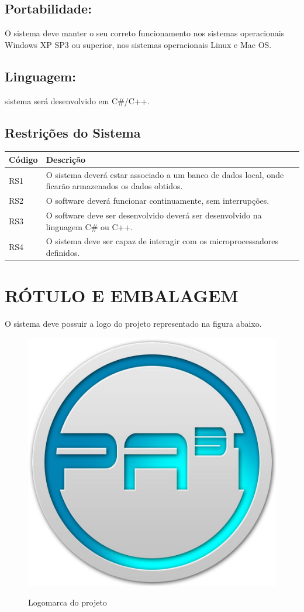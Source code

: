   \subsection*{Portabilidade:}
  O sistema deve manter o seu correto funcionamento nos sistemas operacionais Windows XP SP3 ou superior, nos sistemas operacionais Linux e Mac OS.
	
  \subsection*{Linguagem:}
   sistema será desenvolvido em C\#/C++.

  \subsection*{Restrições do Sistema}
  
     \begin{longtable}{|m{4.0cm}|m{12.2cm}|}
  \hline
\textbf{Código} & \textbf{Descrição}\\
  \hline
RS1 & O sistema deverá estar associado a um banco de dados local, onde ficarão armazenados os dados obtidos.\\
  \hline
RS2 & O software deverá funcionar continuamente, sem interrupções.\\
  \hline
RS3 & O software deve ser desenvolvido deverá ser desenvolvido na linguagem C\# ou C++.\\
  \hline
RS4 & O sistema deve ser capaz de interagir com os microprocessadores definidos.\\
  \hline
 \end{longtable}
  
  \section*{RÓTULO E EMBALAGEM}
  
  O sistema deve possuir a logo do projeto representado na figura abaixo.
  
    \begin{figure}[!h]
    \centering
    \includegraphics[scale = 0.2]{editaveis/figuras/logo}
    \label{logo}
    \caption{Logomarca do projeto}
   \end{figure}
   \FloatBarrier
 
